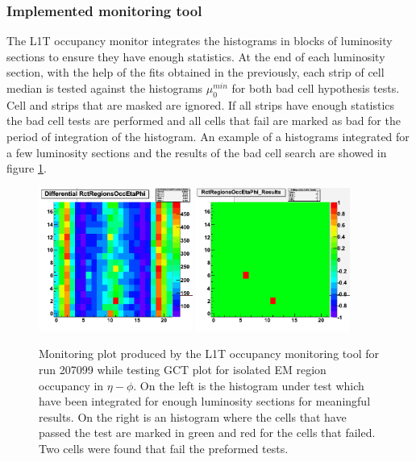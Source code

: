 \subsubsection{Implemented monitoring tool}


The \gls{L1T} occupancy monitor integrates the histograms in blocks of luminosity sections to ensure they have enough statistics. At the end of each luminosity section, with the help of the fits obtained in the previously, each strip of cell median is tested against the histograms $\mu_0^{min}$ for both bad cell hypothesis tests. Cell and strips that are masked are ignored. If all strips have enough statistics the bad cell tests are performed and all cells that fail are marked as bad for the period of integration of the histogram. An example of a histograms integrated for a few luminosity sections and the results of the bad cell search are showed in figure \ref{FIGURE:TechnicalWork_L1TOccupancyTests}. 

\begin{figure}[!htb]
\centering
\includegraphics[width=0.45\textwidth]{Chapter03/L1TOnline/Images/L1TOccupancy_Diff.png}
\includegraphics[width=0.45\textwidth]{Chapter03/L1TOnline/Images/L1TOccupancy_Results.png}
\caption{Monitoring plot produced by the \gls{L1T} occupancy monitoring tool for run 207099 while testing \gls{GCT} plot for isolated \gls{EM} region occupancy in $\eta-\phi$. On the left is the histogram under test which have been integrated for enough luminosity sections for meaningful results. On the right is an histogram where the cells that have passed the test are marked in green and red for the cells that failed. Two cells were found that fail the preformed tests.}
\label{FIGURE:TechnicalWork_L1TOccupancyTests}
\end{figure}

